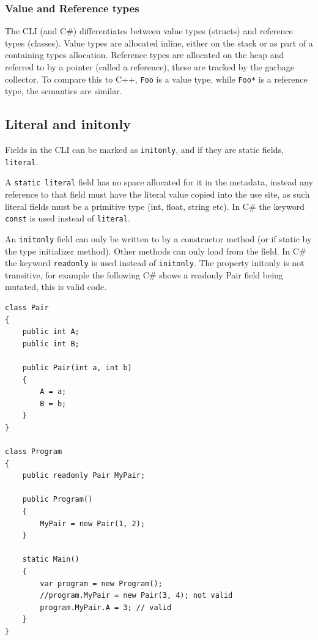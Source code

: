 \documentclass[english]{report}
\begin{document}
\subsubsection{Value and Reference types}

The CLI (and C\#) differentiates between value types (structs) and
reference types (classes). Value types are allocated inline, either
on the stack or as part of a containing types allocation. Reference
types are allocated on the heap and referred to by a pointer (called
a reference), these are tracked by the garbage collector. To compare
this to C++, \texttt{Foo} is a value type, while \texttt{Foo{*}} is
a reference type, the semantics are similar.


\subsection{Literal and initonly\label{sub:Literal-and-initonly}}

Fields in the CLI can be marked as \texttt{initonly}, and if they
are static fields, \texttt{literal}.

A \texttt{static literal} field has no space allocated for it in the
metadata, instead any reference to that field must have the literal
value copied into the use site, as such literal fields must be a primitive
type (int, float, string etc). In C\# the keyword \texttt{const} is
used instead of \texttt{literal}.

An \texttt{initonly} field can only be written to by a constructor
method (or if static by the type initializer method). Other methods
can only load from the field. In C\# the keyword \texttt{readonly}
is used instead of \texttt{initonly}. The property initonly is not
transitive, for example the following C\# shows a readonly Pair field
being mutated, this is valid code.

\begin{lstlisting}[keywordstyle={\color{blue}},language=sharpc]
class Pair
{
	public int A;
	public int B;

	public Pair(int a, int b)
	{
		A = a;
		B = b;
	}
}

class Program
{
	public readonly Pair MyPair;

	public Program()
	{
		MyPair = new Pair(1, 2);
	}

	static Main()
	{
		var program = new Program();
		//program.MyPair = new Pair(3, 4); not valid
		program.MyPair.A = 3; // valid
	}
}
\end{lstlisting}
\end{document}
